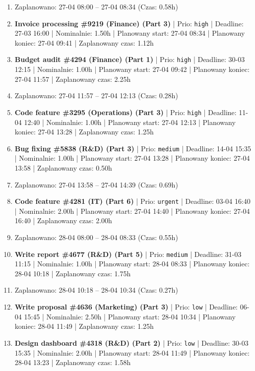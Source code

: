 {\begin{enumerate}
  \item [\textbf{PRZERWA}] Zaplanowano: 27-04 08:00 -- 27-04 08:34 (Czas: 0.58h)
  \item [\textbf{14622}] \textbf{Invoice processing \#9219 (Finance) (Part 3)} | Prio: \texttt{high} | Deadline: 27-03 16:00 | Nominalnie: 1.50h | Planowany start: 27-04 08:34 | Planowany koniec: 27-04 09:41 | Zaplanowany czas: 1.12h
  \item [\textbf{14619}] \textbf{Budget audit \#4294 (Finance) (Part 1)} | Prio: \texttt{high} | Deadline: 30-03 12:15 | Nominalnie: 1.00h | Planowany start: 27-04 09:42 | Planowany koniec: 27-04 11:57 | Zaplanowany czas: 2.25h
  \item [\textbf{PRZERWA}] Zaplanowano: 27-04 11:57 -- 27-04 12:13 (Czas: 0.28h)
  \item [\textbf{14608}] \textbf{Code feature \#3295 (Operations) (Part 3)} | Prio: \texttt{high} | Deadline: 11-04 12:40 | Nominalnie: 1.00h | Planowany start: 27-04 12:13 | Planowany koniec: 27-04 13:28 | Zaplanowany czas: 1.25h
  \item [\textbf{14637}] \textbf{Bug fixing \#5838 (R\&D) (Part 3)} | Prio: \texttt{medium} | Deadline: 14-04 15:35 | Nominalnie: 1.00h | Planowany start: 27-04 13:28 | Planowany koniec: 27-04 13:58 | Zaplanowany czas: 0.50h
  \item [\textbf{PRZERWA}] Zaplanowano: 27-04 13:58 -- 27-04 14:39 (Czas: 0.69h)
  \item [\textbf{14604}] \textbf{Code feature \#4281 (IT) (Part 6)} | Prio: \texttt{urgent} | Deadline: 03-04 16:40 | Nominalnie: 2.00h | Planowany start: 27-04 14:40 | Planowany koniec: 27-04 16:40 | Zaplanowany czas: 2.00h
  \item [\textbf{PRZERWA}] Zaplanowano: 28-04 08:00 -- 28-04 08:33 (Czas: 0.55h)
  \item [\textbf{14640}] \textbf{Write report \#4677 (R\&D) (Part 5)} | Prio: \texttt{medium} | Deadline: 31-03 11:15 | Nominalnie: 1.00h | Planowany start: 28-04 08:33 | Planowany koniec: 28-04 10:18 | Zaplanowany czas: 1.75h
  \item [\textbf{PRZERWA}] Zaplanowano: 28-04 10:18 -- 28-04 10:34 (Czas: 0.27h)
  \item [\textbf{14684}] \textbf{Write proposal \#4636 (Marketing) (Part 3)} | Prio: \texttt{low} | Deadline: 06-04 15:45 | Nominalnie: 2.50h | Planowany start: 28-04 10:34 | Planowany koniec: 28-04 11:49 | Zaplanowany czas: 1.25h
  \item [\textbf{14691}] \textbf{Design dashboard \#4318 (R\&D) (Part 2)} | Prio: \texttt{low} | Deadline: 30-03 15:35 | Nominalnie: 2.00h | Planowany start: 28-04 11:49 | Planowany koniec: 28-04 13:23 | Zaplanowany czas: 1.58h

\end{enumerate}}

